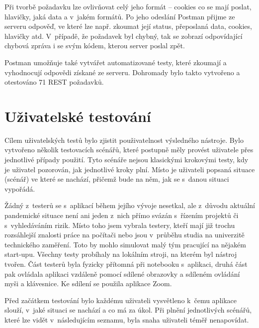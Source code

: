 Při tvorbě požadavku lze ovlivňovat celý jeho formát – cookies co se mají poslat, hlavičky, jaká data a v~jakém formátů. Po jeho odeslání Postman přijme ze serveru odpověď, ve které lze např. zkoumat její status, přeposlaná data, cookies, hlavičky atd. V~případě, že požadavek byl chybný, tak se zobrazí odpovídající chybová zpráva i se svým kódem, kterou server poslal zpět.

Postman umožňuje také vytvářet automatizované testy, které zkoumají a vyhodnocují odpovědi získané ze serveru. Dohromady bylo takto vytvořeno a otestováno 71 REST požadavků.


\section{Uživatelské testování}

Cílem uživatelských testů bylo zjistit použivatelnost výsledného nástroje. Bylo vytvořeno několik testovacích scénářů, které postupně měly provést uživatele přes jednotlivé případy použití. Tyto scénáře nejsou klasickými krokovými testy, kdy je uživatel pozorován, jak jednotlivé kroky plní.  Místo je uživateli popsaná situace (scénář) ve které se nachází, přičemž bude na něm, jak se s~danou situaci vypořádá.

Žádný z~testerů se s~aplikací během jejího vývoje nesetkal, ale z~důvodu aktuální pandemické situace není ani jeden z~nich přímo svázán s~řízením projektů či s~vyhledáváním rizik. Místo toho jsem vybrala testery, kteří mají již trochu rozsáhlejší znalosti práce na počítači nebo jsou v~průběhu studia na univerzitě technického zaměření. Toto by mohlo simulovat malý tým pracující na nějakém start-upu. Všechny testy probíhaly na lokálním stroji, na kterém byl nástroj tvořen. Část testerů byla fyzicky přítomná při notebooku s~aplikaci, druhá část pak ovládala aplikaci vzdáleně pomocí sdílené obrazovky a sdíleném ovládání myši a klávesnice. Ke sdílení se použila aplikace Zoom.

Před začátkem testování bylo každému uživateli vysvětleno k~čemu aplikace slouží, v~jaké situaci se nachází a co má za úkol. Při plnění jednotlivých scénářů, které lze vidět v~následujícím seznamu, byla snaha uživateli téměř nenapovídat.

